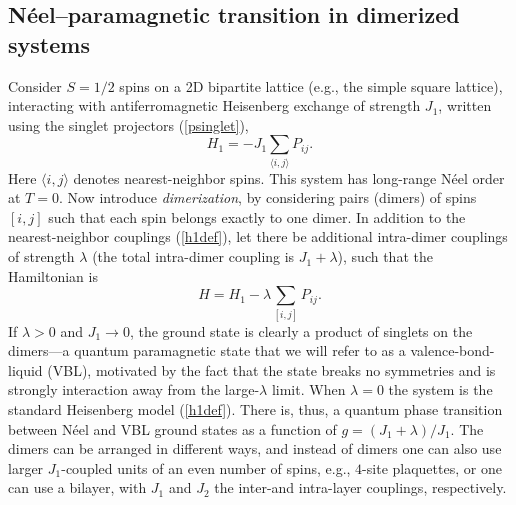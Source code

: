 \documentclass[range]{ar2e}
\begin{document}
\subsection{N\'eel--paramagnetic transition in dimerized systems}
\label{sec:dimermodels}

Consider $S=1/2$ spins on a 2D bipartite lattice (e.g., the simple square lattice), interacting with antiferromagnetic Heisenberg exchange of 
strength $J_1$, written using the singlet projectors (\ref{psinglet}),
\begin{equation}
H_1 = -J_1 \sum_{\langle i,j\rangle} P_{ij}.
\label{h1def}
\end{equation}
Here $\langle i,j\rangle$ denotes nearest-neighbor spins. This system has long-range N\'eel order at $T=0$. Now introduce {\it dimerization}, 
by considering pairs (dimers) of spins $[i,j]$ such that each spin belongs exactly to one dimer. In addition to the nearest-neighbor couplings (\ref{h1def}),
let there be additional intra-dimer couplings of strength $\lambda$ (the total intra-dimer coupling is $J_1+\lambda$), such that the Hamiltonian is
\begin{equation}
H = H_1  -\lambda \sum_{[ i,j]} P_{ij} .
\end{equation}
If $\lambda>0$ and $J_1\to 0$, the ground state is clearly a product of singlets on the dimers---a quantum paramagnetic state that we will refer
to as a valence-bond-liquid (VBL), motivated by the fact that the state breaks no symmetries and is strongly interaction away from the large-$\lambda$
limit. When $\lambda=0$  the system is the standard Heisenberg model (\ref{h1def}). There is, thus, a quantum phase transition between N\'eel and VBL ground 
states as a function of $g=(J_1+\lambda)/J_1$. The dimers can be arranged in different ways, and instead of dimers one can also use larger $J_1$-coupled 
units of an even number of spins, e.g., $4$-site plaquettes, or one can use a bilayer, with $J_1$ and $J_2$ the inter-and intra-layer couplings, respectively.
\end{document}
